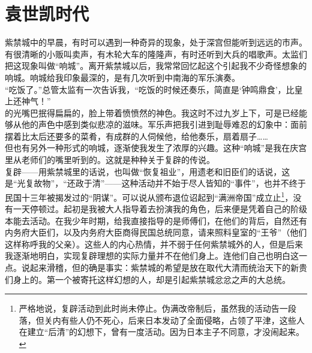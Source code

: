 \fancyhead[RO]{} %
\fancyhead[LE]{} %
\chapter*{袁世凯时代}
\thispagestyle{empty}
紫禁城中的早晨，有时可以遇到一种奇异的现象，处于深宫但能听到远远的市声。有很清晰的小贩叫卖声，有木轮大车的隆隆声，有时还听到大兵的唱歌声。太监们把这现象叫做“响城”。离开紫禁城以后，我常常回忆起这个引起我不少奇怪想象的响城。响城给我印象最深的，是有几次听到中南海的军乐演奏。\\

“吃饭了。”总管太监有一次告诉我，“吃饭的时候还奏乐，简直是‘钟鸣鼎食’，比皇上还神气！”\\

的光嘴巴抿得扁扁的，脸上带着愤愤然的神色。我这时不过九岁上下，可是已经能够从他的声色中感到类似悲凉的滋味。军乐声把我引进到耻辱难忍的幻象中：面前摆着比太后还要多的菜肴，有成群的人伺候他，给他奏乐，扇着扇子……\\

但也有另外一种形式的响城，逐渐使我发生了浓厚的兴趣。这种“响城”是我在庆宫里从老师们的嘴里听到的。这就是种种关于复辟的传说。\\

复辟——用紫禁城里的话说，也叫做“恢复祖业”，用遗老和旧臣们的话说，这是“光复故物”，“还政于清”——这种活动并不始于尽人皆知的“事件”，也并不终于民国十三年被揭发过的“阴谋”。可以说从颁布退位诏起到“满洲帝国”成立止\footnote{严格地说，复辟活动到此时尚未停止。伪满改帝制后，虽然我的活动告一段落，但关内有些人仍不死心，后来日本发动了全面侵略，占领了平津，这些人在建立“后清”的幻想下，曾有一度活动。因为日本主子不同意，才没闹起来。}，没有一天停顿过。起初是我被大人指导着去扮演我的角色，后来便是凭着自己的阶级本能去活动。在我少年时期，给我直接指导的是师傅们，在他们的背后，自然还有内务府大臣们，以及内务府大臣商得民国总统同意，请来照料皇室的“王爷”（他们这样称呼我的父亲）。这些人的内心热情，并不弱于任何紫禁城外的人，但是后来我逐渐地明白，实现复辟理想的实际力量并不在他们身上。连他们自己也明白这一点。说起来滑稽，但的确是事实：紫禁城的希望是放在取代大清而统治天下的新贵们身上的。第一个被寄托这样幻想的人，却是引起紫禁城忿忿之声的大总统。\\

